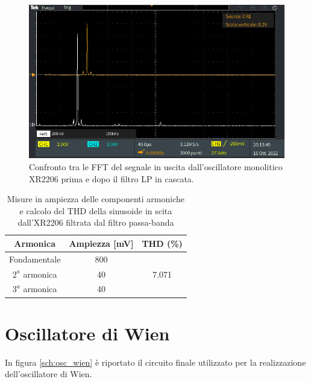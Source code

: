 \documentclass[titlepage]{report}
\begin{document}
	\begin{figure}[H]
		\centering
		\includegraphics[scale=0.5]{Immagini/fft_xr+lp.PNG}
		\caption{Confronto tra le FFT del segnale in uscita dall'oscillatore monolitico XR2206 prima e dopo il filtro LP in cascata.}
		\label{fig:FFTxr+LP}
	\end{figure}


	\begin{table}[h!]
		\centering
		\begin{tabular}{||c|c|c||}
			\hline
			\cellcolor{gray!10}Armonica & \cellcolor{gray!10}Ampiezza [mV] & \cellcolor{gray!10}THD (\%) \\
			\hline
			Fondamentale & 800 &\\
			\cline{1-2}
			$2^a$ armonica & 40 & 7.071 \\
			\cline{1-2} 
			$3^a$ armonica & 40 & \\
			\hline	
		\end{tabular}
		\caption{Misure in ampiezza delle componenti armoniche e calcolo del THD della sinusoide in scita dall'XR2206 filtrata dal filtro passa-banda}
		\label{tab:THD_XR2206+BP}
	\end{table}

\newpage
\section{Oscillatore di Wien}

	In figura \ref{sch:osc_wien} è riportato il circuito finale utilizzato per la realizzazione dell'oscillatore di Wien.
\end{document}
